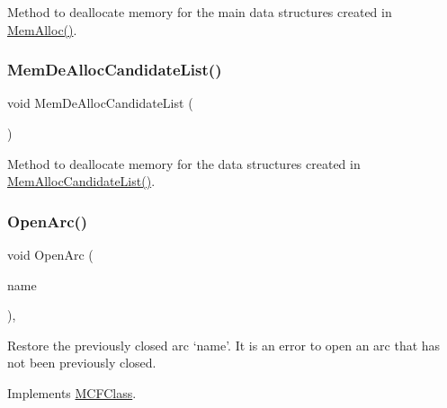 Method to deallocate memory for the main data structures created in \mbox{\hyperlink{class_m_c_f_simplex_a0f5c43a76c4b5140beeaa378a659c772}{Mem\+Alloc()}}. \mbox{\label{class_m_c_f_simplex_a0481186b3a286006206194536049fa4e}} 
\subsubsection{\texorpdfstring{Mem\+De\+Alloc\+Candidate\+List()}{MemDeAllocCandidateList()}}
{\footnotesize\ttfamily void Mem\+De\+Alloc\+Candidate\+List (\begin{DoxyParamCaption}\item[{void}]{ }\end{DoxyParamCaption})\hspace{0.3cm}{\ttfamily [private]}}

Method to deallocate memory for the data structures created in \mbox{\hyperlink{class_m_c_f_simplex_a8121db5b0073f67ecdf7db437e16aa2a}{Mem\+Alloc\+Candidate\+List()}}. \mbox{\label{class_m_c_f_simplex_af8adf5d3a1f9dfb9c2dd30c170663136}} 
\subsubsection{\texorpdfstring{Open\+Arc()}{OpenArc()}}
{\footnotesize\ttfamily void Open\+Arc (\begin{DoxyParamCaption}\item[{\mbox{\hyperlink{class_m_c_f_class_a76aaabb20535c51a2752b93f6c38fe54}{c\+Index}}}]{name }\end{DoxyParamCaption})\hspace{0.3cm}{\ttfamily [override]}, {\ttfamily [virtual]}}

Restore the previously closed arc `name'. It is an error to open an arc that has not been previously closed. 

Implements \mbox{\hyperlink{class_m_c_f_class_ab902a23d1c9520a22b79de5d451c3348}{M\+C\+F\+Class}}.

\mbox{\label{class_m_c_f_simplex_af1a941ba6508775aab50d90a919ada6e}} 
